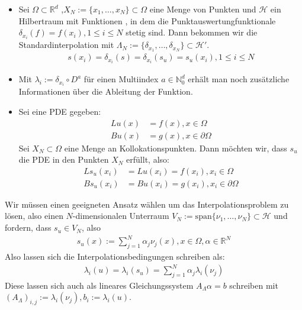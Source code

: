 \begin{example}
\begin{itemize}
\item
Sei $\Omega \subset \mathbb{R}^d$ ,$X_N := \{x_1, \dots, x_N\} \subset \Omega$ eine Menge von Punkten und $\mathcal{H}$ ein Hilbertraum mit Funktionen , in dem die Punktauswertungfunktionale $\delta_{x_i}(f) = f(x_i), 1\le i \le N$  stetig sind. Dann bekommen wir die Standardinterpolation mit $\Lambda_N := \{\delta_{x_1}, \dots,\delta_{x_N}\} \subset \mathcal{H}'$.
\begin{align*}
s(x_i) = \delta_{x_i}(s) = \delta_{x_i}(s_u) = s_u(x_i), 1\le i \le N
\end{align*}
\item
Mit $\lambda_i := \delta_{x_i} \circ D^a$ für einen Multiindex $a \in \mathbb{N}_0^d$ erhält man noch zusätzliche Informationen über die Ableitung der Funktion.
\item
Sei eine \ac{PDE} gegeben:
\begin{align*}
L u(x) &= f(x), x \in \Omega \\
B u(x) &= g(x), x \in \partial \Omega
\end{align*}
Sei $X_N \subset \Omega$ eine Menge an Kollokationspunkten. Dann möchten wir, dass $s_u$ die \ac{PDE} in den Punkten $X_N$ erfüllt, also:
\begin{align*}
L s_u(x_i) &= L u(x_i) = f(x_i), x_i \in \Omega \\
B s_u(x_i) &= B u(x_i) = g(x_i), x_i \in \partial \Omega
\end{align*}
\end{itemize}
\end{example}

Wir müssen einen geeigneten Ansatz wählen um das Interpolationsproblem zu lösen, also einen $N$-dimensionalen Unterraum $V_N := \text{span}\{\nu_1, \dots, \nu_N\} \subset \mathcal{H}$ und fordern, dass $s_u \in V_N$, also 
\begin{align*}
s_u(x) := \sum_{j=1}^N \alpha_j \nu_j(x), x \in \Omega, \alpha \in \mathbb{R}^N
\end{align*}
Also lassen sich die Interpolationsbedingungen schreiben als:
\begin{align*}
\lambda_i(u) = \lambda_i(s_u) = \sum_{j=1}^N \alpha_j \lambda_i(\nu_j)
\end{align*}
Diese lassen sich auch als lineares Gleichungssystem $A_\Lambda \alpha = b$ schreiben  mit $(A_\Lambda)_{i,j} := \lambda_i(\nu_j), b_i := \lambda_i(u)$.



